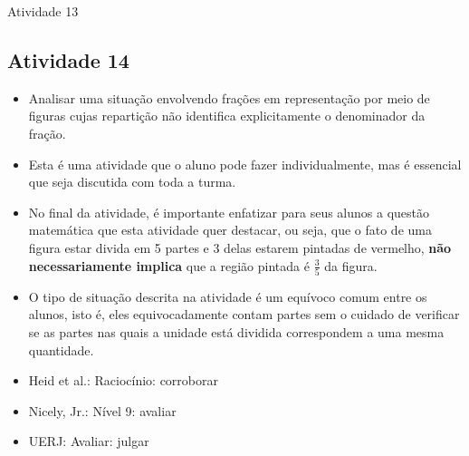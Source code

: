 \begin{multicols}{2}
\begin{resposta*}{Atividade 13}
\begin{center}
  \end{center}

  \end{resposta*}



\subsection{Atividade 14}




  \vspace{.1cm}

  \begin{itemize} %
    \item       Analisar uma situação envolvendo frações em representação por meio de figuras cujas repartição não identifica explicitamente o denominador da fração.
\end{itemize} %


  \vspace{.1cm}

  \vspace{.1cm}

\begin{itemize} %
    \item       Esta é uma atividade que o aluno pode fazer individualmente, mas é essencial que seja discutida com toda a turma.
    \item       No final da atividade, é importante enfatizar para seus alunos a questão matemática que esta atividade quer destacar, ou seja, que o fato de uma figura estar divida em 5 partes e 3 delas estarem pintadas de vermelho,       {\bf não necessariamente implica}       que a região pintada é       $\frac{3}{5}$ da figura.
    \item       O tipo de situação descrita na atividade é um equívoco comum entre os alunos, isto é, eles equivocadamente contam partes sem o cuidado de verificar se as partes nas quais a unidade está dividida correspondem a uma mesma quantidade.
\end{itemize} %


  \vspace{.1cm}

 \vspace{.1cm}
\begin{itemize} %
    \item       Heid et al.: Raciocínio: corroborar
    \item       Nicely, Jr.: Nível 9: avaliar
    \item       UERJ: Avaliar: julgar
\end{itemize} %




\end{multicols}
